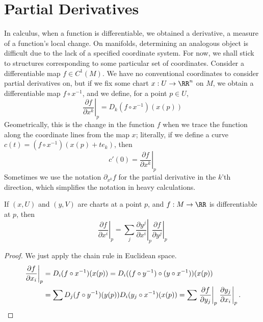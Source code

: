 \section{Partial Derivatives}

In calculus, when a function is differentiable, we obtained a derivative, a measure of a function's local change. On manifolds, determining an analogous object is difficult due to the lack of a specified coordinate system. For now, we shall stick to structures corresponding to some particular set of coordinates. Consider a differentiable map $f \in C^1(M)$. We have no conventional coordinates to consider partial derivatives on, but if we fix some chart $x:U \to \RR^n$ on $M$, we obtain a differentiable map $f \circ x^{-1}$, and we define, for a point $p \in U$,
%
\[ \left. \frac{\partial f}{\partial x^k} \right|_p = D_k(f \circ x^{-1})(x(p)) \]
%
Geometrically, this is the change in the function $f$ when we trace the function along the coordinate lines from the map $x$; literally, if we define a curve $c(t) = (f \circ x^{-1})(x(p) + te_k)$, then
%
\[ c'(0) = \left.\frac{\partial f}{\partial x^k}\right|_p \]
%
Sometimes we use the notation $\partial_{x^k} f$ for the partial derivative in the $k$'th direction, which simplifies the notation in heavy calculations.

\begin{theorem}
    If $(x,U)$ and $(y,V)$ are charts at a point $p$, and $f: M \to \RR$ is differentiable at $p$, then
    \[ \left. \frac{\partial f}{\partial x^i} \right|_p = \sum_j \left. \frac{\partial y^j}{\partial x^i} \right|_p \left. \frac{\partial f}{\partial y^j} \right|_p \]
\end{theorem}
\begin{proof}
    We just apply the chain rule in Euclidean space.
    \begin{align*}
        \left.\frac{\partial f}{\partial x_i}\right|_p &= D_i(f \circ x^{-1})(x(p)) = D_i((f \circ y^{-1}) \circ (y \circ x^{-1}))(x(p))\\
        &= \sum D_j(f \circ y^{-1})(y(p)) D_i(y_j \circ x^{-1})(x(p)) = \sum \left.\frac{\partial f}{\partial y_j}\right|_p \left.\frac{\partial y_j}{\partial x_i}\right|_p. \qedhere
    \end{align*}
\end{proof}


